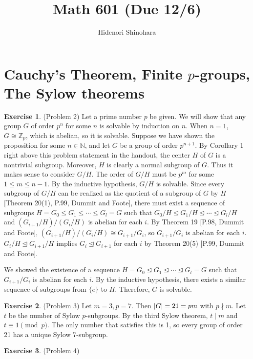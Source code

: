\documentclass[12pt, psamsfonts]{amsart}
\theoremstyle{definition}
\newtheorem*{exer}{Exercise}
\theoremstyle{remark}
\numberwithin{equation}{section}
\begin{document}
\title{Math 601 (Due 12/6)}
\author{Hidenori Shinohara}
\maketitle

\tableofcontents

\section{Cauchy's Theorem, Finite $p$-groups, The Sylow theorems}

\begin{exer}{(Problem 2)}
  Let a prime number $p$ be given.
  We will show that any group $G$ of order $p^n$ for some $n$ is solvable by induction on $n$.
  When $n = 1$, $G \cong \mathbb{Z}_p$, which is abelian, so it is solvable.
  Suppose we have shown the proposition for some $n \in \mathbb{N}$, and let $G$ be a group of order $p^{n + 1}$.
  By Corollary 1 right above this problem statement in the handout, the center $H$ of $G$ is a nontrivial subgroup.
  Moreover, $H$ is clearly a normal subgroup of $G$.
  Thus it makes sense to consider $G / H$.
  The order of $G / H$ must be $p^m$ for some $1 \leq m \leq n - 1$.
  By the inductive hypothesis, $G / H$ is solvable.
  Since every subgroup of $G / H$ can be realized as the quotient of a subgroup of $G$ by $H$[Theorem 20(1), P.99, Dummit and Foote], there must exist a sequence of subgroups $H = G_0 \leq G_1 \leq \cdots \leq G_l = G$ such that $G_0 / H \trianglelefteq G_1 / H \trianglelefteq \cdots \trianglelefteq G_l / H$ and $(G_{i + 1} / H) / (G_{i} / H)$ is abelian for each $i$.
  By Theorem 19 [P.98, Dummit and Foote], $(G_{i + 1} / H) / (G_{i} / H) \cong G_{i + 1} / G_{i}$, so $G_{i + 1} / G_i$ is abelian for each $i$.
  $G_i / H \trianglelefteq G_{i + 1} / H$ implies $G_i \trianglelefteq G_{i + 1}$ for each $i$ by Theorem 20(5) [P.99, Dummit and Foote].

  We showed the existence of a sequence $H = G_0 \trianglelefteq G_1 \trianglelefteq \cdots \trianglelefteq G_l = G$ such that $G_{i + 1} / G_i$ is abelian for each $i$.
  By the inductive hypothesis, there exists a similar sequence of subgroups from $\{ e \}$ to $H$.
  Therefore, $G$ is solvable.
\end{exer}

\begin{exer}{(Problem 3)}
  Let $m = 3, p = 7$.
  Then $\abs{G} = 21 = pm$ with $p \nmid m$.
  Let $t$ be the number of Sylow $p$-subgroups.
  By the third Sylow theorem, $t \mid m$ and $t \equiv 1 \pmod p$.
  The only number that satisfies this is 1, so every group of order 21 has a unique Sylow 7-subgroup.
\end{exer}

\begin{exer}{(Problem 4)}
\end{exer}
\end{document}
